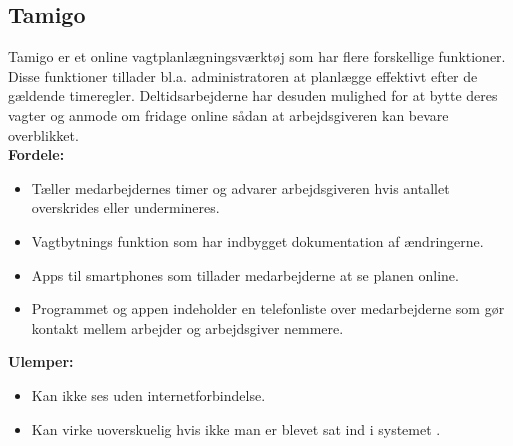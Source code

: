 \subsection{Tamigo}
Tamigo er et online vagtplanlægningsværktøj som har flere forskellige funktioner. Disse funktioner tillader bl.a. administratoren at planlægge effektivt efter de gældende timeregler. Deltidsarbejderne har desuden mulighed for at bytte deres vagter og anmode om fridage online sådan at arbejdsgiveren kan bevare overblikket.\\

\textbf{Fordele: }
\begin{itemize}
\item {Tæller medarbejdernes timer og advarer arbejdsgiveren hvis antallet overskrides eller undermineres.}
\item {Vagtbytnings funktion som har indbygget dokumentation af ændringerne.}
\item {Apps til smartphones som tillader medarbejderne at se planen online.}
\item {Programmet og appen indeholder en telefonliste over medarbejderne som gør kontakt mellem arbejder og arbejdsgiver nemmere.}\\
\end{itemize}

\textbf{Ulemper: }
\begin{itemize}
\item {Kan ikke ses uden internetforbindelse.}
\item {Kan virke uoverskuelig hvis ikke man er blevet sat ind i systemet \citep{Tamigo, Trustpilot}.}
\end{itemize}




